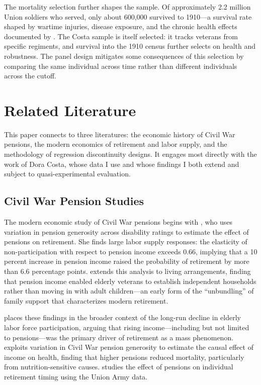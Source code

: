 \documentclass[12pt]{article}
\begin{document}
The mortality selection further shapes the sample. Of approximately 2.2 million Union soldiers who served, only about 600,000 survived to 1910---a survival rate shaped by wartime injuries, disease exposure, and the chronic health effects documented by \citet{costa2012health}. The Costa sample is itself selected: it tracks veterans from specific regiments, and survival into the 1910 census further selects on health and robustness. The panel design mitigates some consequences of this selection by comparing the same individual across time rather than different individuals across the cutoff.


\section{Related Literature}

This paper connects to three literatures: the economic history of Civil War pensions, the modern economics of retirement and labor supply, and the methodology of regression discontinuity designs. It engages most directly with the work of Dora Costa, whose data I use and whose findings I both extend and subject to quasi-experimental evaluation.

\subsection{Civil War Pension Studies}

The modern economic study of Civil War pensions begins with \citet{costa1995pensions}, who uses variation in pension generosity across disability ratings to estimate the effect of pensions on retirement. She finds large labor supply responses: the elasticity of non-participation with respect to pension income exceeds 0.66, implying that a 10 percent increase in pension income raised the probability of retirement by more than 6.6 percentage points. \citet{costa1997displacing} extends this analysis to living arrangements, finding that pension income enabled elderly veterans to establish independent households rather than moving in with adult children---an early form of the ``unbundling'' of family support that characterizes modern retirement.

\citet{costa1998pensions} places these findings in the broader context of the long-run decline in elderly labor force participation, arguing that rising income---including but not limited to pensions---was the primary driver of retirement as a mass phenomenon. \citet{eli2015income} exploits variation in Civil War pension generosity to estimate the causal effect of income on health, finding that higher pensions reduced mortality, particularly from nutrition-sensitive causes. \citet{vitek2022effect} studies the effect of pensions on individual retirement timing using the Union Army data.
\end{document}
